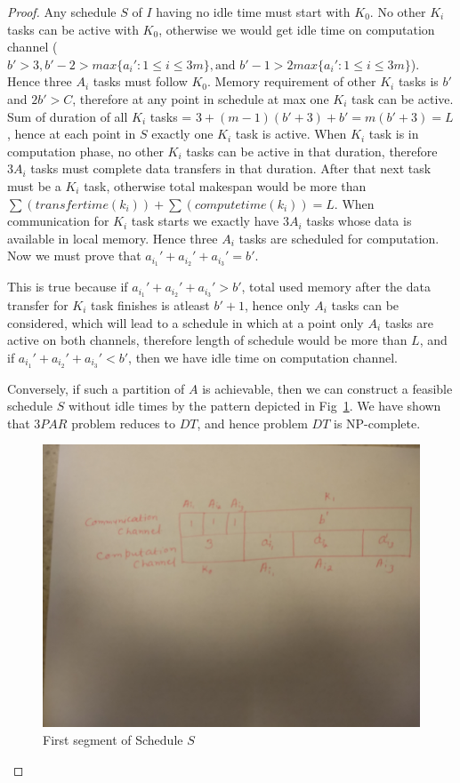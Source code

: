 \documentclass[runningheads]{llncs} %
\begin{document}
\begin{proof}
	Any schedule $S$ of $I$ having no idle time must start with $K_0$. No other $K_i$ tasks can be active with $K_0$, otherwise we would get idle time on computation channel ($b'>3, b'-2>max\{a_i':1\le i\le 3m\},  \text{and } b'-1 > 2 max\{a_i':1\le i\le 3m\}$). Hence three $A_i$ tasks must follow $K_0$.   	 
   	Memory requirement of other $K_i$ tasks is $b'$ and $2b'>C$, therefore at any point in schedule at max one $K_i$ task can be active. Sum of duration of all $K_i$ tasks = $3 + (m-1)(b'+3) + b' = m (b'+3)=L$, hence at each point in $S$ exactly one $K_i$ task is active. When $K_i$ task is in computation phase, no other $K_i$ tasks can be active in that duration, therefore  $3A_i$ tasks must complete data transfers in that duration. After that next task must be a 
   	$K_i$ task, otherwise total makespan would be more than $\sum(transfertime(k_i))  + 
   	\sum(computetime(k_i)) =L$. When communication for  $K_i$ task starts we exactly have $3A_i$ 
   	tasks whose data is available in local memory. Hence three $A_i$ tasks are scheduled for computation. Now we must prove that $a_{i_1}' + a_{i_2}'  + a_{i_3}'  = b'$.
   	
   	This is true because if $a_{i_1}' + a_{i_2}'  + a_{i_3}'  > b'$, total used memory after the data transfer 
   	for  $K_i$ task finishes is atleast $b'+1$, hence only $A_i$ tasks can be considered, which will lead to a schedule in which at a point only $A_i$ tasks are active on both channels, therefore length of 
   	schedule would be more than $L$, and if $a_{i_1}' + a_{i_2}'  + a_{i_3}'  < b'$, then we have idle time on computation channel.
   	
   	Conversely, if such a partition of $A$ is achievable, then we can construct a feasible schedule $S$ 
   	without idle times by the pattern depicted in Fig~\ref{fig:firstSegment}. We have shown that $3PAR$ 
   	problem reduces to $DT$, and hence problem $DT$ is NP-complete.
   	
   	
   	\begin{figure}[htb]
   		\centering
   		\includegraphics[scale=0.07]{Figs/3PARToSched.jpg}
   		\caption{ \label{fig:firstSegment} First segment of Schedule $S$}
   	\end{figure}
   	
   \end{proof}
\end{document}
